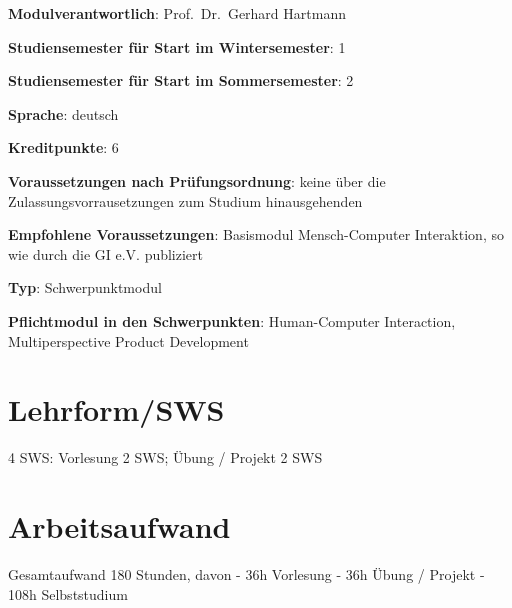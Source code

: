 \begin{modulHead}
\textbf{Modulverantwortlich}: Prof.~Dr.~Gerhard
Hartmann
\end{modulHead}
\begin{modulHead}
\textbf{Studiensemester für
Start im Wintersemester}:
1
\end{modulHead}
\begin{modulHead}
\textbf{Studiensemester für Start
im Sommersemester}:
2
\end{modulHead}
\begin{modulHead}
\textbf{Sprache}:
deutsch
\end{modulHead}
\begin{modulHead}
\textbf{Kreditpunkte}:
6
\end{modulHead}
\begin{modulHead}
\textbf{Voraussetzungen nach
Prüfungsordnung}: keine über die Zulassungsvorrausetzungen zum Studium
hinausgehenden
\end{modulHead}
\begin{modulHead}
\textbf{Empfohlene
Voraussetzungen}: Basismodul Mensch-Computer Interaktion, so wie durch
die GI e.V. publiziert
\end{modulHead}
\begin{modulHead}
\textbf{Typ}:
Schwerpunktmodul
\end{modulHead}
\begin{modulHead}
\textbf{Pflichtmodul
in den Schwerpunkten}: Human-Computer Interaction, Multiperspective
Product Development
\end{modulHead}


\section*{Lehrform/SWS\label{/mi-2017/modulbeschreibungen-master/MA_HCI_InteractionDesign}}\label{lehrformswspathlabelmi-2017modulbeschreibungen-mastermaux5fhciux5finteractiondesign}

4 SWS: Vorlesung 2 SWS; Übung / Projekt 2 SWS

\section*{Arbeitsaufwand\label{/mi-2017/modulbeschreibungen-master/MA_HCI_InteractionDesign}}\label{arbeitsaufwandpathlabelmi-2017modulbeschreibungen-mastermaux5fhciux5finteractiondesign}

Gesamtaufwand 180 Stunden, davon - 36h Vorlesung - 36h Übung / Projekt -
108h Selbststudium

